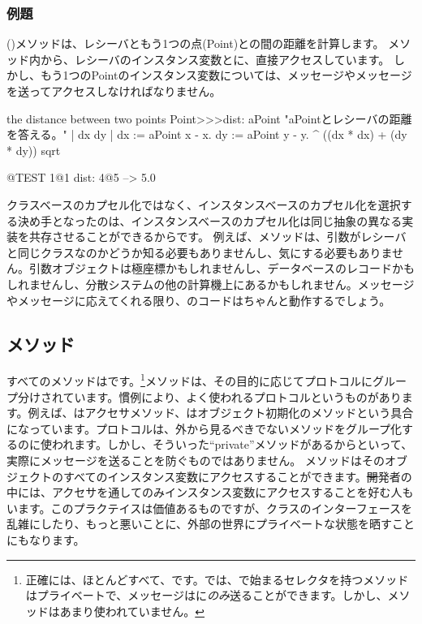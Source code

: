 \documentclass[a4paper,10pt,twoside]{book}
\begin{document}
\subsubsection{例題}
 ()メソッドは、レシーバともう1つの点(Point)との間の距離を計算します。
メソッド内から、レシーバのインスタンス変数とに、直接アクセスしています。
しかし、もう1つのPointのインスタンス変数については、メッセージやメッセージを送ってアクセスしなければなりません。

\begin{method}[dist:]{the distance between two points}
Point>>>dist: aPoint 
	"aPointとレシーバの距離を答える。"  
	| dx dy |
	dx := aPoint x - x.
	dy :=  aPoint y - y.
	^ ((dx * dx) + (dy * dy)) sqrt
\end{method}

\begin{code}{@TEST}
1@1 dist: 4@5 --> 5.0
\end{code}

クラスベースのカプセル化ではなく、インスタンスベースのカプセル化を選択する決め手となったのは、インスタンスベースのカプセル化は同じ抽象の異なる実装を共存させることができるからです。
例えば、メソッドは、引数がレシーバと同じクラスなのかどうか知る必要もありませんし、気にする必要もありません。引数オブジェクトは極座標かもしれませんし、データベースのレコードかもしれませんし、分散システムの他の計算機上にあるかもしれません。メッセージやメッセージに応えてくれる限り、のコードはちゃんと動作するでしょう。

\subsection{メソッド}

すべてのメソッドはです。\footnote{正確には、ほとんどすべて、です。\pharo では、で始まるセレクタを持つメソッドはプライベートで、メッセージは\self に\emph{のみ}送ることができます。しかし、メソッドはあまり使われていません。}メソッドは、その目的に応じてプロトコルにグループ分けされています。慣例により、よく使われるプロトコルというものがあります。例えば、はアクセサメソッド、はオブジェクト初期化のメソッドという具合になっています。プロトコルは、外から見るべきでないメソッドをグループ化するのに使われます。しかし、そういった``private''メソッドがあるからといって、実際にメッセージを送ることを防ぐものではありません。
メソッドはそのオブジェクトのすべてのインスタンス変数にアクセスすることができます。\st 開発者の中には、アクセサを通してのみインスタンス変数にアクセスすることを好む人もいます。このプラクテイスは価値あるものですが、クラスのインターフェースを乱雑にしたり、もっと悪いことに、外部の世界にプライベートな状態を晒すことにもなります。
\end{document}
